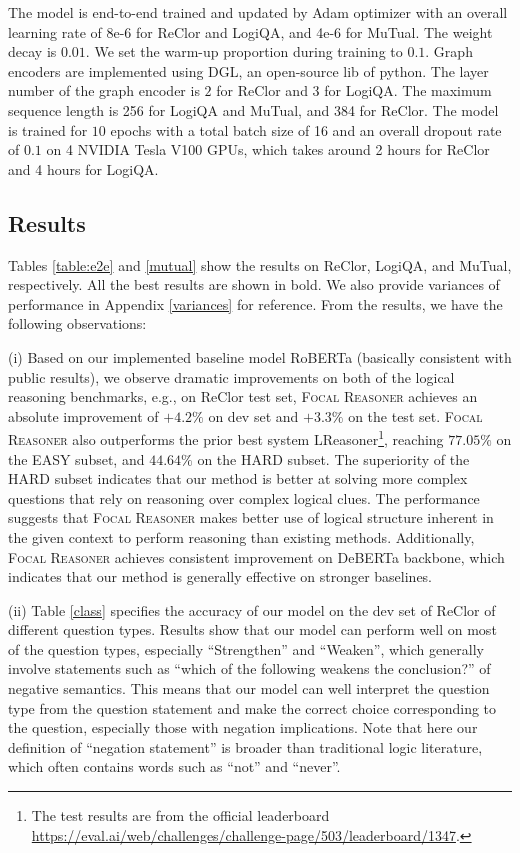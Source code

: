 \documentclass[11pt]{article}
\begin{document}
The model is end-to-end trained and updated by Adam \citep{2014arxiv1412.6980k} optimizer with an overall learning rate of 8e-6 for ReClor and LogiQA, and 4e-6 for MuTual. The weight decay is $0.01$. We set the warm-up proportion during training to $0.1$. Graph encoders are implemented using DGL, an open-source lib of python. The layer number of the graph encoder is $2$ for ReClor and $3$ for LogiQA.  The maximum sequence length is 256 for LogiQA and MuTual, and 384 for ReClor. The model is trained for $10$ epochs with a total batch size of 16 and an overall dropout rate of $0.1$ on 4 NVIDIA Tesla V100 GPUs, which takes around 2 hours for ReClor and 4 hours for LogiQA.




\subsection{Results}    
Tables \ref{table:e2e} and \ref{mutual} show the results on ReClor, LogiQA, and MuTual, respectively. All the best results are shown in bold. We also provide variances of performance in Appendix \ref{variances} for reference. From the results, we have the following observations:

(i) Based on our implemented baseline model RoBERTa (basically consistent with public results), we observe dramatic improvements on both of the logical reasoning benchmarks, e.g., on ReClor test set, \textsc{Focal Reasoner} achieves an absolute improvement of $+4.2\%$ on dev set and $+3.3\%$ on the test set. \textsc{Focal Reasoner} also outperforms the prior best system LReasoner\footnote{The test results are from the official leaderboard \url{https://eval.ai/web/challenges/challenge-page/503/leaderboard/1347}.}, reaching $77.05\%$ on the EASY subset, and $44.64\%$ on the HARD subset. The superiority of the HARD subset indicates that our method is better at solving more complex questions that rely on reasoning over complex logical clues. The performance suggests that \textsc{Focal Reasoner} makes better use of logical structure inherent in the given context to perform reasoning than existing methods. Additionally, \textsc{Focal Reasoner} achieves consistent improvement on DeBERTa backbone, which indicates that our method is generally effective on stronger baselines.


(ii) Table \ref{class} specifies the accuracy of our model on the dev set of ReClor of different question types. Results show that our model can perform well on most of the question types, especially ``Strengthen'' and ``Weaken'', which generally involve statements such as ``which of the following weakens the conclusion?'' of negative semantics. This means that our model can well interpret the question type from the question statement and make the correct choice corresponding to the question, especially those with negation implications. Note that here our definition of ``negation statement'' is broader than traditional logic literature, which often contains words such as ``not'' and ``never''.
\end{document}
